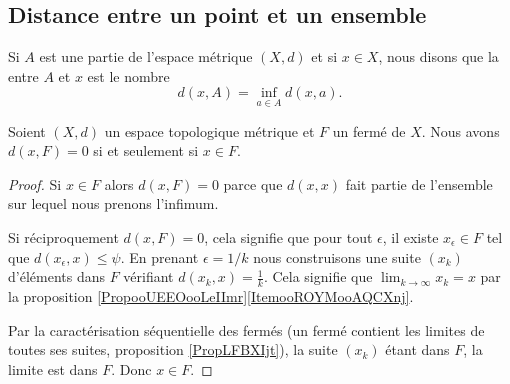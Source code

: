\subsection{Distance entre un point et un ensemble}

\begin{definition}
	Si $A$ est une partie de l'espace métrique $(X,d)$ et si $x\in X$, nous disons que la  entre $A$ et $x$ est le nombre
	\begin{equation}		\label{EqdefDistaA}
		d(x,A)=\inf_{a\in A}d(x,a).
	\end{equation}
\end{definition}
\newcommand{\CaptionFigDistanceEnsemble}{La distance entre $x$ et $A$ est donnée par la distance entre $x$ et $p$. Les distances entre $x$ et les autres points de $A$ sont plus grandes que $d(x,p)$.}


\begin{proposition}     \label{PropGULUooNzqZKj}
    Soient \( (X,d) \) un espace topologique métrique et \( F\) un fermé de \( X\). Nous avons \( d(x,F)=0\) si et seulement si \( x\in F\).
\end{proposition}

\begin{proof}
    Si \( x\in F\) alors \( d(x,F)=0\) parce que \( d(x,x)\) fait partie de l'ensemble sur lequel nous prenons l'infimum.

    Si réciproquement \( d(x,F)=0\), cela signifie que pour tout \( \epsilon\), il existe \( x_{\epsilon}\in F\) tel que \( d(x_{\epsilon},x)\leq \psi\). En prenant \(\epsilon=1/k\) nous construisons une suite \( (x_k)\) d'éléments dans \( F\) vérifiant \( d(x_k,x)=\frac{1}{ k }\). Cela signifie que \( \lim_{k\to \infty} x_k=x\) par la proposition \ref{PropooUEEOooLeIImr}\ref{ItemooROYMooAQCXnj}.

    Par la caractérisation séquentielle des fermés (un fermé contient les limites de toutes ses suites, proposition \ref{PropLFBXIjt}), la suite \( (x_k)\) étant dans \( F\), la limite est dans \( F\). Donc \( x\in F\).
\end{proof}

